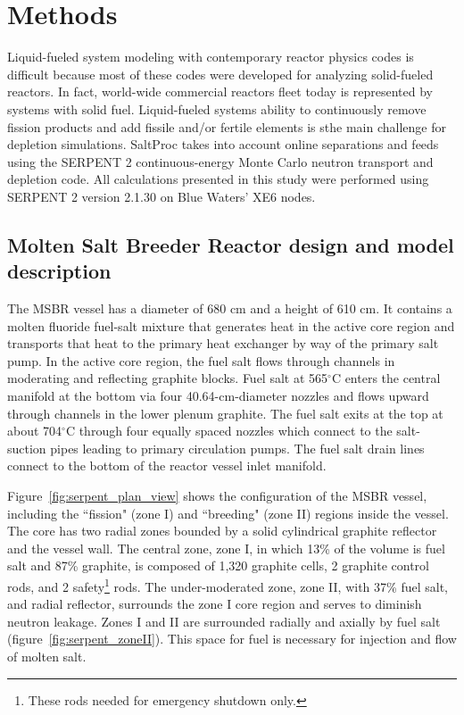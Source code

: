 \section{Methods}

Liquid-fueled system modeling with contemporary reactor physics codes is 
difficult because most of these codes were developed for analyzing solid-fueled 
reactors. In fact, world-wide commercial reactors fleet today is represented by 
systems with solid fuel. Liquid-fueled systems ability to continuously remove 
fission products and add fissile and/or fertile elements is sthe main challenge 
for depletion simulations. SaltProc takes into account online separations and 
feeds using the SERPENT 2 continuous-energy Monte Carlo neutron transport and 
depletion code.  All calculations presented in this study were performed using 
SERPENT 2 version 2.1.30 on Blue Waters’ XE6 nodes. 

\subsection{Molten Salt Breeder Reactor design and model description}
The \gls{MSBR} vessel has a diameter of 680 cm and a height of 610 cm. It 
contains a molten fluoride fuel-salt mixture that generates heat in the active 
core region and transports that heat to the primary heat exchanger by way of 
the primary salt pump. In the active core region, the fuel salt flows through 
channels in moderating and reflecting graphite blocks. Fuel salt at
565$^{\circ}$C enters the central manifold at the bottom via four 
40.64-cm-diameter nozzles and flows upward through channels in the lower plenum 
graphite. The fuel salt exits at the top at about 704$^{\circ}$C through four 
equally spaced nozzles which connect to the salt-suction pipes leading to 
primary circulation pumps. The fuel salt drain lines connect to the bottom of 
the reactor vessel inlet manifold.

Figure~\ref{fig:serpent_plan_view} shows the configuration of the 
\gls{MSBR} vessel, including the ``fission" (zone I) and ``breeding" 
(zone II) regions inside the vessel. The core has two radial zones bounded by a 
solid cylindrical graphite reflector and the vessel wall. The central zone, 
zone I, in which 13\% of the volume is fuel salt and 87\% graphite, is
composed of 1,320 graphite cells, 2 graphite control rods, and 2 
safety\footnote{ These rods needed for emergency shutdown only.} rods. The 
under-moderated zone, zone II, with 37\% fuel salt, and radial reflector, 
surrounds the zone I core region and serves to diminish neutron leakage. Zones 
I and II are surrounded radially and axially by fuel salt 
(figure~\ref{fig:serpent_zoneII}). This space for fuel is necessary for 
injection and flow of molten salt.

